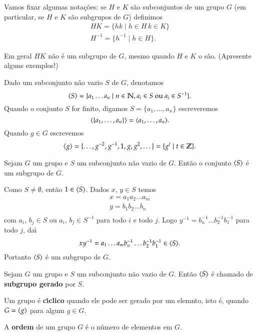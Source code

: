 Vamos fixar algumas nota\c{c}\~oes: se $H$ e $K$ s\~ao subconjuntos de um grupo $G$ (em particular, se $H$ e $K$ s\~ao subgrupos de $G$) definimos
\begin{align*}
	HK = \{hk \mid h \in H\, k \in K\}\\
	H^{-1} = \{h^{-1} \mid h \in H\}.
\end{align*}

Em geral $HK$ n\~ao \'e um subgrupo de $G$, mesmo quando $H$ e $K$ o s\~ao. (Apresente alguns exemplos!)

Dado um subconjunto n\~ao vazio $S$ de $G$, denotamos
\[
	\langle{S}\rangle = \{a_1\dots a_n \mid n \in \mathbb{N}, a_i \in S \mbox{ ou } a_i \in S^{-1}\}.
\]
Quando o conjunto $S$ for finito, digamos $S = \{a_1, \dots, a_n\}$ escreveremos
\[
	\langle{\{a_1,\dots, a_n\}}\rangle = \langle{a_1,\dots,a_n}\rangle.
\]
Quando $g \in G$ escrevemos
\[
	\langle{g}\rangle = \{\dots, g^{-2}, g^{-1}, 1, g, g^2,\dots\} = \{g^t \mid t \in \mathbb{Z}\}.
\]

\begin{proposicao}
	Sejam $G$ um grupo e $S$ um subconjunto n\~ao vazio de $G$. Ent\~ao o conjunto $\langle{S}\rangle$ \'e um subgrupo de $G$.
\end{proposicao}
\begin{prova}
	Como $S \ne \emptyset$, ent\~ao $1 \in \langle{S}\rangle$. Dados $x$, $y \in S$ temos
	\begin{align*}
		x = a_1a_2\dots a_m\\
		y = b_1b_2\dots b_n\\
	\end{align*}
	com $a_i$, $b_j \in S$ ou $a_i$, $b_j \in S^{-1}$ para todo $i$ e todo $j$. Logo $y^{-1} = b_n^{-1}\dots b_2^{-1}b_1^{-1}$ para todo $j$, da{\'\i}
	\[
		xy^{-1} = a_1\dots a_mb_{n}^{-1}\dots b_2^{-1}b_1^{-1} \in \langle{S}\rangle.
	\]
	Portanto $\langle{S}\rangle$ \'e um subgrupo de $G$.
\end{prova}

\begin{definicao}
	Sejam $G$ um grupo e $S$ um subconjunto n\~ao vazio de $G$. Ent\~ao $\langle{S}\rangle$ \'e chamado de \textbf{subgrupo gerado} por $S$.
\end{definicao}

\begin{definicao}
	Um grupo \'e \textbf{c{\'\i}clico} quando ele pode ser gerado por um elemnto, isto \'e, quando $G = \langle{g}\rangle$ para algum $g \in G$.
\end{definicao}

\begin{definicao}
	A \textbf{ordem} de um grupo $G$ \'e o n\'umero de elementos em $G$.
\end{definicao}

